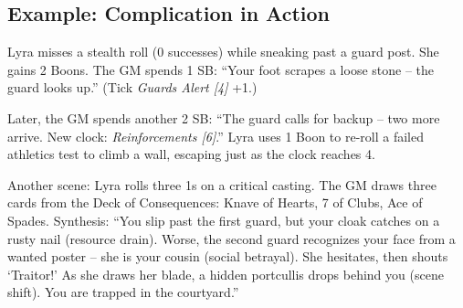 \subsection{Example: Complication in Action}

Lyra misses a stealth roll (0 successes) while sneaking past a guard post. She gains 2 Boons. The GM spends 1 SB: ``Your foot scrapes a loose stone – the guard looks up.'' (Tick \textit{Guards Alert [4]} +1.)

Later, the GM spends another 2 SB: ``The guard calls for backup – two more arrive. New clock: \textit{Reinforcements [6]}.'' Lyra uses 1 Boon to re-roll a failed athletics test to climb a wall, escaping just as the clock reaches 4.

Another scene: Lyra rolls three 1s on a critical casting. The GM draws three cards from the Deck of Consequences: Knave of Hearts, 7 of Clubs, Ace of Spades. Synthesis: ``You slip past the first guard, but your cloak catches on a rusty nail (resource drain). Worse, the second guard recognizes your face from a wanted poster – she is your cousin (social betrayal). She hesitates, then shouts `Traitor!' As she draws her blade, a hidden portcullis drops behind you (scene shift). You are trapped in the courtyard.''

